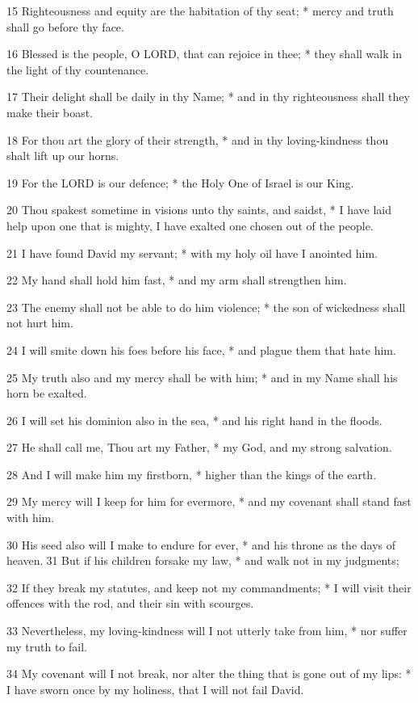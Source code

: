 15 Righteousness and equity are the habitation of thy
seat; * mercy and truth shall go before thy face.

16 Blessed is the people, O LORD, that can rejoice
in thee; * they shall walk in the light of thy countenance.

17 Their delight shall be daily in thy Name; * and
in thy righteousness shall they make their boast.

18 For thou art the glory of their strength, * and
in thy loving-kindness thou shalt lift up our horns.

19 For the LORD is our defence; * the Holy One of Israel
is our King.

20 Thou spakest sometime in visions unto thy saints,
and saidst, * I have laid help upon one that is mighty, I have exalted
one chosen out of the people.

21 I have found David my servant; * with my holy oil
have I anointed him.

22 My hand shall hold him fast, * and my arm shall
strengthen him.

23 The enemy shall not be able to do him violence;
* the son of wickedness shall not hurt him.

24 I will smite down his foes before his face, * and
plague them that hate him.

25 My truth also and my mercy shall be with him; *
and in my Name shall his horn be exalted.

26 I will set his dominion also in the sea, * and his
right hand in the floods.

27 He shall call me, Thou art my Father, * my God,
and my strong salvation.

28 And I will make him my firstborn, * higher than
the kings of the earth.

29 My mercy will I keep for him for evermore, * and
my covenant shall stand fast with him.

30 His seed also will I make to endure for ever, *
and his throne as the days of heaven.31 But if his children forsake my
law, * and walk not in my judgments;

32 If they break my statutes, and keep not my commandments;
* I will visit their offences with the rod, and their sin with scourges.

33 Nevertheless, my loving-kindness will I not utterly
take from him, * nor suffer my truth to fail.

34 My covenant will I not break, nor alter the thing
that is gone out of my lips: * I have sworn once by my holiness, that
I will not fail David.

